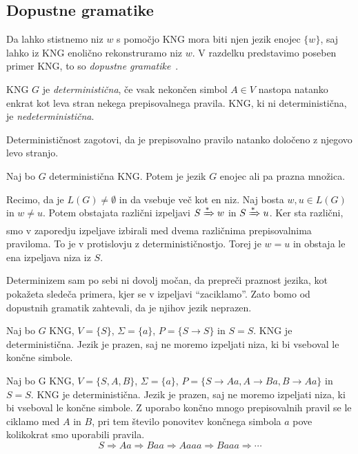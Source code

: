 \documentclass[fin1, tisk]{fmfdelo}
\theoremstyle{definition}
\begin{document}
\subsection{Dopustne gramatike}

Da lahko stistnemo niz $w$ s pomočjo KNG mora biti njen jezik enojec $\{ w \}$, saj lahko
iz KNG enolično rekonstruramo niz $w$. V razdelku predstavimo poseben primer KNG, to so
\emph{dopustne gramatike}~\cite{KiefferYang2000}.

\begin{definicija}
    KNG $G$ je \emph{deterministična}, če vsak nekončen simbol $A \in V$ nastopa natanko enkrat
    kot leva stran nekega prepisovalnega pravila. KNG, ki ni deterministična, je 
    \emph{nedeterministična}.
\end{definicija}

Determinističnost zagotovi, da je prepisovalno pravilo natanko določeno z njegovo levo stranjo.

\begin{trditev}\label{trditev:DetJezik}
    Naj bo $G$ deterministična KNG. Potem je jezik $G$ enojec ali pa prazna množica.
\end{trditev}

\begin{dokaz}
    Recimo, da je $L(G) \neq \emptyset$ in da vsebuje več kot en niz. Naj bosta $w, u \in L(G)$
    in $w \neq u$. Potem obstajata različni izpeljavi $S \xRightarrow{*} w$ in 
    $S \xRightarrow{*} u$. Ker sta različni, smo v zaporedju izpeljave izbirali med dvema 
    različnima prepisovalnima praviloma. To je v protislovju z determinističnostjo. Torej je 
    $w = u$ in obstaja le ena izpeljava niza iz $S$.
\end{dokaz}

Determinizem sam po sebi ni dovolj močan, da prepreči praznost jezika, kot pokažeta sledeča
primera, kjer se v izpeljavi ``zaciklamo''. Zato bomo od dopustnih gramatik zahtevali, da je 
njihov jezik neprazen.

\begin{primer}
    Naj bo $G$ KNG, $V = \{ S \}$, $\Sigma = \{ a \}$, $P = \{ S \rightarrow S \}$ in $S = S$.
    KNG je deterministična. Jezik je prazen, saj ne moremo izpeljati niza, ki bi vseboval le
    končne simbole.
\end{primer}

\begin{primer}
    Naj bo G KNG, $V = \{ S, A, B \} $, $\Sigma = \{ a \}$, 
    $P = \{ S \rightarrow \mathit{Aa}, A \rightarrow \mathit{Ba}, B \rightarrow Aa \}$ in $S = S$. 
    KNG je deterministična. Jezik je prazen, saj ne moremo izpeljati niza, ki bi vseboval le 
    končne simbole. Z uporabo končno mnogo prepisovalnih pravil se le ciklamo med $A$ in $B$, 
    pri tem število ponovitev končnega simbola $a$ pove kolikokrat smo uporabili pravila.
    \[
        S \Rightarrow \mathit{Aa} \Rightarrow \mathit{Baa} \Rightarrow \mathit{Aaaa} \Rightarrow
        \mathit{Baaa} \Rightarrow \cdots
    \]
\end{primer}
\end{document}
